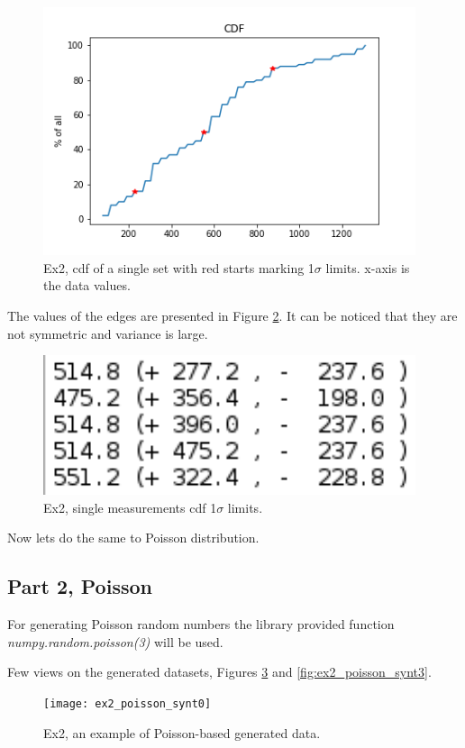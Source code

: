 \documentclass{article}
\begin{document}
\begin{figure}[!hbt]
	\centering
	\includegraphics[width=4.3in]{ex2_cdf}
	\caption{Ex2, cdf of a single set with red starts marking 1$\sigma$ limits. x-axis is the data values.}
	\label{fig:ex2_cdf}
\end{figure}

The values of the edges are presented in Figure \ref{fig:ex2_singlecdfresult}. It can be noticed that they are not symmetric and variance is large.

\begin{figure}[!hbt]
	\centering
	\includegraphics[width=4.3in]{ex2_singlecdfresult}
	\caption{Ex2, single measurements cdf 1$\sigma$ limits.}
	\label{fig:ex2_singlecdfresult}
\end{figure}

Now lets do the same to Poisson distribution.

\clearpage
\subsection*{Part 2, Poisson}
For generating Poisson random numbers the library provided function \textit{numpy.random.poisson(3)} will be used.

Few views on the generated datasets, Figures \ref{fig:ex2_poisson_synt0} and \ref{fig:ex2_poisson_synt3}.

\begin{figure}[!hbt]
	\centering
	\texttt{[image: ex2\_poisson\_synt0]}
	\caption{Ex2, an example of Poisson-based generated data.}
	\label{fig:ex2_poisson_synt0}
\end{figure}
\end{document}

